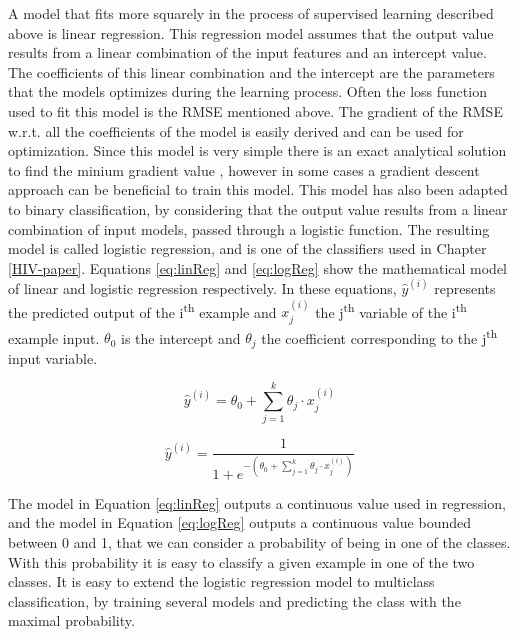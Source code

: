 \documentclass[
  11pt,
  twoside,
  BCOR=10mm,
  listof=totoc]{scrbook}
\begin{document}
A model that fits more squarely in the process of supervised learning described above is linear regression. This regression model assumes that the output value results from a linear combination of the input features and an intercept value. The coefficients of this linear combination and the intercept are the parameters that the models optimizes during the learning process. Often the loss function used to fit this model is the RMSE mentioned above. The gradient of the RMSE w.r.t. all the coefficients of the model is easily derived and can be used for optimization. Since this model is very simple there is an exact analytical solution to find the minium gradient value \autocite{hastieElementsStatisticalLearning2009}, however in some cases a gradient descent approach can be beneficial to train this model. This model has also been adapted to binary classification, by considering that the output value results from a linear combination of input models, passed through a logistic function. The resulting model is called logistic regression, and is one of the classifiers used in Chapter \ref{HIV-paper}. Equations \eqref{eq:linReg} and \eqref{eq:logReg} show the mathematical model of linear and logistic regression respectively. In these equations, \(\hat{y}^{(i)}\) represents the predicted output of the i\textsuperscript{th} example and \(x_j^{(i)}\) the j\textsuperscript{th} variable of the i\textsuperscript{th} example input. \(\theta_0\) is the intercept and \(\theta_j\) the coefficient corresponding to the j\textsuperscript{th} input variable.

\begin{equation}
  \hat{y}^{(i)} = \theta_0 + \sum_{j=1}^k \theta_j \cdot x_j^{(i)}
  \label{eq:linReg}
\end{equation}

\begin{equation}
  \hat{y}^{(i)} = \frac{1}{
    1 + e^{
      -(\theta_0 + \sum_{j=1}^k \theta_j \cdot x_j^{(i)})
    }
  }
  \label{eq:logReg}
\end{equation}

The model in Equation \eqref{eq:linReg} outputs a continuous value used in regression, and the model in Equation \eqref{eq:logReg} outputs a continuous value bounded between 0 and 1, that we can consider a probability of being in one of the classes. With this probability it is easy to classify a given example in one of the two classes. It is easy to extend the logistic regression model to multiclass classification, by training several models and predicting the class with the maximal probability.
\end{document}
